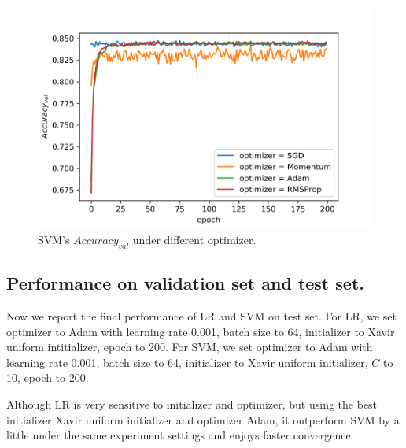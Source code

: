 \documentclass[journal, a4paper]{IEEEtran}
\begin{document}
\begin{figure}[!hbt]
	\begin{center}
		\includegraphics[width=\columnwidth]{svm_optim_val_acc}
		\caption{SVM's $Accuracy_{val}$ under different optimizer.}
		\label{fig:svm_optim_val_acc}
	\end{center}
\end{figure} \par

\subsection{Performance on validation set and test set.}
Now we report the final performance of LR and SVM on test set. For LR, we set optimizer to Adam with learning rate 0.001, batch size to 64, initializer to Xavir uniform intitializer, epoch to 200. For SVM, we set optimizer to Adam with learning rate 0.001, batch size to 64, initializer to Xavir uniform initializer, $C$ to 10, epoch to 200. \par
Although LR is very sensitive to initializer and optimizer, but using the best initializer Xavir uniform initializer and optimizer Adam, it outperform SVM by a little under the same experiment settings and enjoys faster convergence. \par
\end{document}
